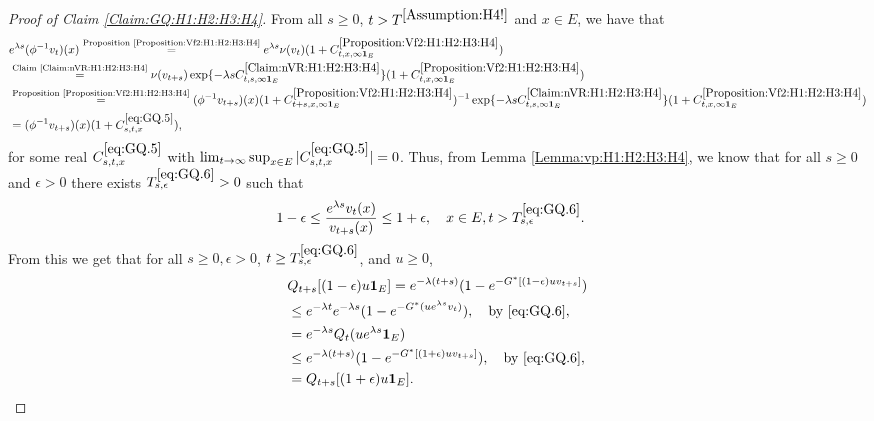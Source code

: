 \documentclass[12pt,a4paper]{amsart}
\numberwithin{equation}{section}
\theoremstyle{plain}
\theoremstyle{definition}
\theoremstyle{remark}
\newcounter{N}
\newcounter{n}[N]
\begin{document}
\begin{proof}[Proof of Claim \ref{Claim:GQ:H1:H2:H3:H4}]
From all $s\geq 0$, $t>T^{\ref{Assumption:H4!}}$ and $x\in E$, we have that
\begin{align}
& e^{\lambda s}(\phi^{-1}v_t)(x)
\overset{\text{Proposition \ref{Proposition:Vf2:H1:H2:H3:H4}}}= e^{\lambda s}\nu(v_{t})(1+ C^{\ref{Proposition:Vf2:H1:H2:H3:H4}}_{t,x,\infty \mathbf 1_E})
\\&\overset{\text{Claim \ref{Claim:nVR:H1:H2:H3:H4}}}=\nu(v_{t+s}) \exp\{-\lambda sC^{\ref{Claim:nVR:H1:H2:H3:H4}}_{t,s,\infty \mathbf 1_E}\} (1+ C^{\ref{Proposition:Vf2:H1:H2:H3:H4}}_{t,x,\infty \mathbf 1_E})
\\&\overset{\text{Proposition \ref{Proposition:Vf2:H1:H2:H3:H4}}}= (\phi^{-1}v_{t+s})(x) (1+ C^{\ref{Proposition:Vf2:H1:H2:H3:H4}}_{t+s,x,\infty \mathbf 1_E})^{-1} \exp\{-\lambda sC^{\ref{Claim:nVR:H1:H2:H3:H4}}_{t,s,\infty \mathbf 1_E}\} (1+ C^{\ref{Proposition:Vf2:H1:H2:H3:H4}}_{t,x,\infty \mathbf 1_E})
\\& \label{eq:GQ.5}= (\phi^{-1}v_{t+s})(x) (1+C_{s,t,x}^{\eqref{eq:GQ.5}}),
\end{align}
for some real $C_{s,t,x}^{\eqref{eq:GQ.5}}$ with $\lim_{t\to \infty}\sup_{x\in E} |C_{s,t,x}^{\eqref{eq:GQ.5}}| =0$.
Thus, from Lemma \ref{Lemma:vp:H1:H2:H3:H4}, we know that for all $s\geq 0$ and $\epsilon >0$ there exists $T^{\eqref{eq:GQ.6}}_{s,\epsilon}>0$ such that
\begin{align}
\label{eq:GQ.6}
& 1-\epsilon
\leq \frac{e^{\lambda s}v_t(x)}{v_{t+s}(x)}
\leq 1+\epsilon,
\quad x\in E, t> T^{\eqref{eq:GQ.6}}_{s,\epsilon}.
\end{align}
From this we get that for all $s\geq 0, \epsilon > 0$, $t\ge T^{\eqref{eq:GQ.6}}_{s,\epsilon}$, and $u\geq 0$,
\begin{align}
& Q_{t+s}[ (1-\epsilon)u\mathbf 1_E ]
= e^{-\lambda(t+s)}( 1-e^{-G^*[(1-\epsilon)uv_{t+s}]} )
\\ & \leq e^{-\lambda t} e^{-\lambda s}( 1- e^{-G^*(ue^{\lambda s}v_t)} ),\quad\text{by \eqref{eq:GQ.6}},
\\\label{eq:GQ.7}&= e^{-\lambda s}Q_t(ue^{\lambda s} \mathbf 1_E)
\\&\leq e^{-\lambda(t+s)}( 1-e^{-G^*[(1+\epsilon)uv_{t+s}]} ),\quad\text{by \eqref{eq:GQ.6}},
\\\label{eq:GQ.8}&= Q_{t+s}[ (1+\epsilon)u\mathbf 1_E ].

\end{align}
\end{proof}
\end{document}
